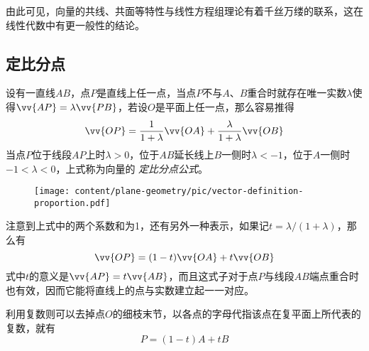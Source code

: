 由此可见，向量的共线、共面等特性与线性方程组理论有着千丝万缕的联系，这在线性代数中有更一般性的结论。



\subsection{定比分点}
\label{sec:definition-proportion}

设有一直线$AB$，点$P$是直线上任一点，当点$P$不与$A$、$B$重合时就存在唯一实数$\lambda$使得$\vv{AP}=\lambda\vv{PB}$，若设$O$是平面上任一点，那么容易推得
\begin{equation}
  \label{eq:vector-definition-proportion}
  \vv{OP} = \frac{1}{1+\lambda} \vv{OA} + \frac{\lambda}{1+\lambda} \vv{OB}
\end{equation}
当点$P$位于线段$AP$上时$\lambda>0$，位于$AB$延长线上$B$一侧时$\lambda<-1$，位于$A$一侧时$-1<\lambda<0$，上式称为向量的 \emph{定比分点公式}。

\begin{figure}[htbp]
\centering
\texttt{[image: content/plane-geometry/pic/vector-definition-proportion.pdf]}
\caption{}
\label{fig:vector-definition-proportion}
\end{figure}

注意到上式中的两个系数和为1，还有另外一种表示，如果记$t= \lambda / (1+\lambda)$，那么有
\begin{equation}
  \label{eq:vector-definition-proportion-t}
  \vv{OP} = (1-t) \vv{OA} + t \vv{OB}
\end{equation}
式中$t$的意义是$\vv{AP} = t \vv{AB}$，而且这式子对于点$P$与线段$AB$端点重合时也有效，因而它能将直线上的点与实数建立起一一对应。

利用复数则可以去掉点$O$的细枝末节，以各点的字母代指该点在复平面上所代表的复数，就有
\begin{equation}
  \label{eq:complex-definition-proportion}
  P = (1-t)A + tB
\end{equation}

